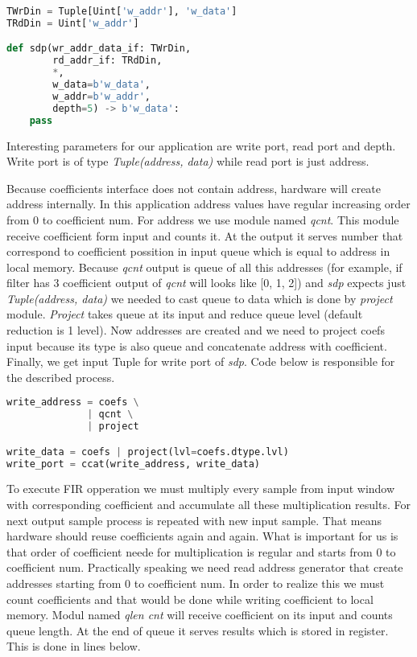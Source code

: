 \documentclass[a4paper, 12pt]{article}
\begin{document}
\begin{lstlisting}[language=Python, caption=Simple Dual Port memory wrapper]
TWrDin = Tuple[Uint['w_addr'], 'w_data']
TRdDin = Uint['w_addr']

def sdp(wr_addr_data_if: TWrDin,
        rd_addr_if: TRdDin,
        *,
        w_data=b'w_data',
        w_addr=b'w_addr',
        depth=5) -> b'w_data':
    pass
\end{lstlisting}

Interesting parameters for our application are write port, read port and depth. Write port is of type \textit{Tuple(address, data)} while read port is just address.

Because coefficients interface does not contain address, hardware will create address internally. In this application address values have regular increasing order from 0 to coefficient num. For address we use module named \textit{qcnt}. This module receive coefficient form input and counts it. At the output it serves number that correspond to coefficient possition in input queue which is equal to address in local memory. Because \textit{qcnt} output is queue of all this addresses (for example, if filter has 3 coefficient output of \textit{qcnt} will looks like [0, 1, 2]) and \textit{sdp} expects just \textit{Tuple(address, data)} we needed to cast queue to data which is done by \textit{project} module. \textit{Project} takes queue at its input and reduce queue level (default reduction is 1 level). Now addresses are created and we need to project coefs input because its type is also queue and concatenate address with coefficient. Finally, we get input Tuple for write port of \textit{sdp}. Code below is responsible for the described process.

\begin{lstlisting}[language=Python, caption=Building write port]
write_address = coefs \
              | qcnt \
              | project

write_data = coefs | project(lvl=coefs.dtype.lvl)
write_port = ccat(write_address, write_data)
\end{lstlisting}

To execute FIR opperation we must multiply every sample from input window with corresponding coefficient and accumulate all these multiplication results. For next output sample process is repeated with new input sample. That means hardware should reuse coefficients again and again. What is important for us is that order of coefficient neede for multiplication is regular and starts from 0 to coefficient num. Practically speaking we need read address generator that create addresses starting from 0 to coefficient num. In order to realize this we must count coefficients and that would be done while writing coefficient to local memory. Modul named \textit{qlen cnt}  will receive coefficient on its input and counts queue length. At the end of queue it serves results which is stored in register. This is done in lines below. 
\end{document}
